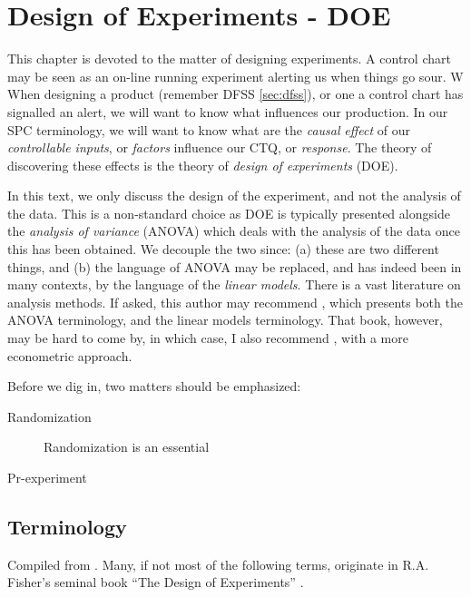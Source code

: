 \chapter{Design of Experiments - DOE}

This chapter is devoted to the matter of designing experiments.
A control chart may be seen as an on-line running experiment alerting us when things go sour. W
When designing a product (remember DFSS \ref{sec:dfss}), or one a control chart has signalled an alert, we will want to know what influences our production.
In our SPC terminology, we will want to know what are the \emph{causal} \emph{effect} of our \emph{controllable inputs}, or \emph{factors} influence our CTQ, or \emph{response}. 
The theory of discovering these effects is the theory of \emph{design of experiments} (DOE).

\begin{remark}
In this text, we only discuss the design of the experiment, and not the analysis of the data.
This is a non-standard choice as DOE is typically presented alongside the \emph{analysis of variance} (ANOVA) which deals with the analysis of the data once this has been obtained.
We decouple the two since: 
(a) these are two different things, and 
(b) the language of ANOVA may be replaced, and has indeed been in many contexts, by the language of the \emph{linear models}.
There is a vast literature on analysis methods. 
If asked, this author may recommend \cite{hocking_analysis_1985}, which presents both the ANOVA terminology, and the linear models terminology.
That book, however, may be hard to come by, in which case, I also recommend \cite{greene_econometric_2003}, with a more econometric approach.
\end{remark}


Before we dig in, two matters should be emphasized:
\begin{description}
\item [Randomization] Randomization is an essential 
\item [Pr-experiment]
\end{description}


\section{Terminology}
Compiled from \cite{natrella_nist/sematech_2010}.
Many, if not most of the following terms, originate in R.A. Fisher's seminal book ``The Design of Experiments'' \citep{fisher_design_1960}.

